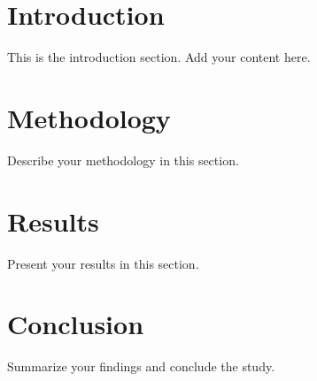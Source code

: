 \documentclass{article}%
\begin{document}
\section{Introduction}%
\label{sec:Introduction}%

%
This is the introduction section. Add your content here.%
\section{Methodology}%
\label{sec:Methodology}%

%
Describe your methodology in this section.%
\section{Results}%
\label{sec:Results}%

%
Present your results in this section.%
\section{Conclusion}%
\label{sec:Conclusion}%

%
Summarize your findings and conclude the study.%
\end{document}
